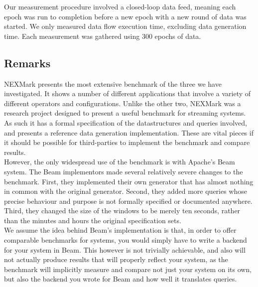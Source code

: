 Our measurement procedure involved a closed-loop data feed, meaning each epoch was run to completion before a new epoch with a new round of data was started. We only measured data flow execution time, excluding data generation time. Each measurement was gathered using 300 epochs of data. \\


\subsection{Remarks}\label{section:nexmark-remarks}
NEXMark presents the most extensive benchmark of the three we have investigated. It shows a number of different applications that involve a variety of different operators and configurations. Unlike the other two, NEXMark was a research project designed to present a useful benchmark for streaming systems. As such it has a formal specification of the datastructures and queries involved, and presents a reference data generation implementation. These are vital pieces if it should be possible for third-parties to implement the benchmark and compare results. \\

However, the only widespread use of the benchmark is with Apache's Beam system. The Beam implementors made several relatively severe changes to the benchmark. First, they implemented their own generator that has almost nothing in common with the original generator. Second, they added more queries whose precise behaviour and purpose is not formally specified or documented anywhere. Third, they changed the size of the windows to be merely ten seconds, rather than the minutes and hours the original specification sets. \\

We assume the idea behind Beam's implementation is that, in order to offer comparable benchmarks for systems, you would simply have to write a backend for your system in Beam. This however is not trivially achievable, and also will not actually produce results that will properly reflect your system, as the benchmark will implicitly measure and compare not just your system on its own, but also the backend you wrote for Beam and how well it translates queries. \\

